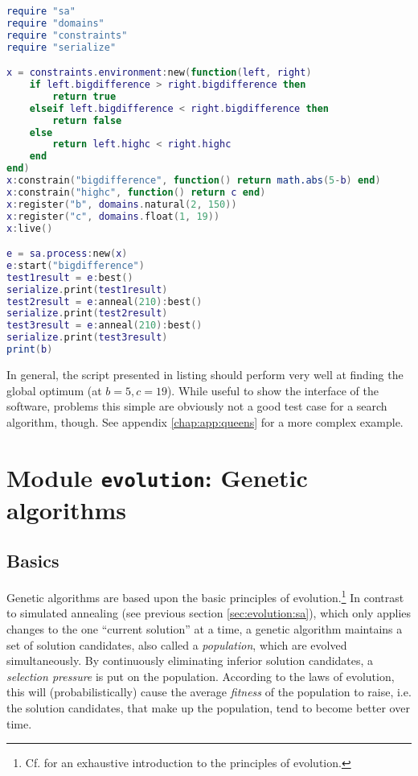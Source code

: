 \begin{lstlisting}[language=lua, caption={Solving (and reiterating) the constraints of listing \ref{lst:constraints1}.}, label=lst:sa, name=lst:sa]
require "sa"
require "domains"
require "constraints"
require "serialize"

x = constraints.environment:new(function(left, right)
	if left.bigdifference > right.bigdifference then
		return true
	elseif left.bigdifference < right.bigdifference then
		return false
	else
		return left.highc < right.highc
	end
end)
x:constrain("bigdifference", function() return math.abs(5-b) end)
x:constrain("highc", function() return c end)
x:register("b", domains.natural(2, 150))
x:register("c", domains.float(1, 19))
x:live()

e = sa.process:new(x)
e:start("bigdifference")
test1result = e:best()
serialize.print(test1result)
test2result = e:anneal(210):best()
serialize.print(test2result)
test3result = e:anneal(210):best()
serialize.print(test3result)
print(b)
\end{lstlisting}

In general, the script presented in listing should perform very well at finding the global optimum (at $b=5, c=19$). While useful to show the interface of the software, problems this simple are obviously not a good test case for a search algorithm, though. See appendix \ref{chap:app:queens} for a more complex example.

\section{Module \texttt{evolution}: Genetic algorithms}
\label{sec:evolution:evolution}

\subsection{Basics}
\label{sec:evolution:basics}

Genetic algorithms are based upon the basic principles of evolution.\footnote{Cf. \cite{Dawkins1990} for an exhaustive introduction to the principles of evolution.} In contrast to simulated annealing (see previous section \ref{sec:evolution:sa}), which only applies changes to the one ``current solution'' at a time, a genetic algorithm maintains a set of solution candidates, also called a \emph{population}, which are evolved simultaneously. By continuously eliminating inferior solution candidates, a \emph{selection pressure} is put on the population. According to the laws of evolution, this will (probabilistically) cause the average \emph{fitness} of the population to raise, i.e. the solution candidates, that make up the population, tend to become better over time.

